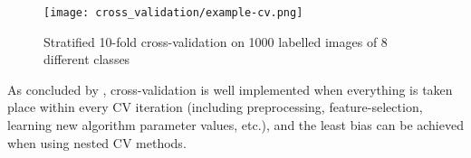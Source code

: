 \begin{figure*}
\centering
  \texttt{[image: cross\_validation/example-cv.png]}
  \caption{Stratified 10-fold cross-validation on 1000 labelled images of 8 different classes}
  \label{fig:example}
\end{figure*}

As concluded by \citet{varma2006bias}, cross-validation is well implemented when everything is taken place within every CV iteration (including preprocessing, feature-selection, learning new algorithm parameter values, etc.), and the least bias can be achieved when using nested CV methods.

